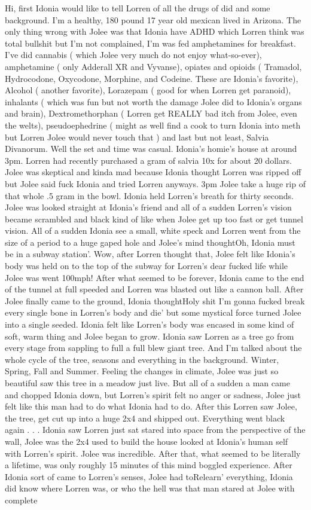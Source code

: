 \documentclass[12pt]{book}
\begin{document}
Hi, first Idonia would like to tell Lorren of all the drugs of did and some background. I'm a healthy, 180 pound 17 year old mexican lived in Arizona. The only thing wrong with Jolee was that Idonia have ADHD which Lorren think was total bullshit but I'm not complained, I'm was fed amphetamines for breakfast. I've did cannabis ( which Jolee very much do not enjoy what-so-ever), amphetamine ( only Adderall XR and Vyvanse), opiates and opioids ( Tramadol, Hydrocodone, Oxycodone, Morphine, and Codeine. These are Idonia's favorite), Alcohol ( another favorite), Lorazepam ( good for when Lorren get paranoid), inhalants ( which was fun but not worth the damage Jolee did to Idonia's organs and brain), Dextromethorphan ( Lorren get REALLY bad itch from Jolee, even the welts), pseudoephedrine ( might as well find a cook to turn Idonia into meth but Lorren Jolee would never touch that ) and last but not least, Salvia Divanorum. Well the set and time was casual. Idonia's homie's house at around 3pm. Lorren had recently purchased a gram of salvia 10x for about 20 dollars. Jolee was skeptical and kinda mad because Idonia thought Lorren was ripped off but Jolee said fuck Idonia and tried Lorren anyways. 3pm Jolee take a huge rip of that whole .5 gram in the bowl. Idonia held Lorren's breath for thirty seconds. Jolee was looked straight at Idonia's friend and all of a sudden Lorren's vision became scrambled and black kind of like when Jolee get up too fast or get tunnel vision. All of a sudden Idonia see a small, white speck and Lorren went from the size of a period to a huge gaped hole and Jolee's mind thoughtOh, Idonia must be in a subway station'. Wow, after Lorren thought that, Jolee felt like Idonia's body was held on to the top of the subway for Lorren's dear fucked life while Jolee was went 100mph! After what seemed to be forever, Idonia came to the end of the tunnel at full speeded and Lorren was blasted out like a cannon ball. After Jolee finally came to the ground, Idonia thoughtHoly shit I'm gonna fucked break every single bone in Lorren's body and die' but some mystical force turned Jolee into a single seeded. Idonia felt like Lorren's body was encased in some kind of soft, warm thing and Jolee began to grow. Idonia saw Lorren as a tree go from every stage from sappling to full a full blew giant tree. And I'm talked about the whole cycle of the tree, seasons and everything in the background. Winter, Spring, Fall and Summer. Feeling the changes in climate, Jolee was just so beautiful saw this tree in a meadow just live. But all of a sudden a man came and chopped Idonia down, but Lorren's spirit felt no anger or sadness, Jolee just felt like this man had to do what Idonia had to do. After this Lorren saw Jolee, the tree, get cut up into a huge 2x4 and shipped out. Everything went black again . . .  Idonia saw Lorren just sat stared into space from the perspective of the wall, Jolee was the 2x4 used to build the house looked at Idonia's human self with Lorren's spirit. Jolee was incredible. After that, what seemed to be literally a lifetime, was only roughly 15 minutes of this mind boggled experience. After Idonia sort of came to Lorren's senses, Jolee had toRelearn' everything, Idonia did know where Lorren was, or who the hell was that man stared at Jolee with complete 
\end{document}
